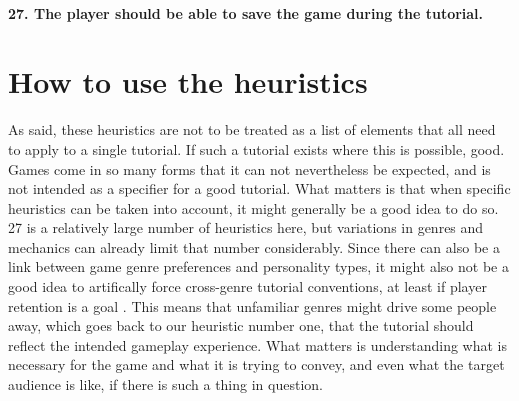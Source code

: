 \paragraph{27. The player should be able to save the game during the tutorial.}

\section{How to use the heuristics}

As said, these heuristics are not to be treated as a list of elements that all need to apply to a single tutorial. If such a tutorial exists where this is possible, good. Games come in so many forms that it can not nevertheless be expected, and is not intended as a specifier for a good tutorial. What matters is that when specific heuristics can be taken into account, it might generally be a good idea to do so. 27 is a relatively large number of heuristics here, but variations in genres and mechanics can already limit that number considerably. Since there can also be a link between game genre preferences and personality types, it might also not be a good idea to artifically force cross-genre tutorial conventions, at least if player retention is a goal \cite{Peever2012}. This means that unfamiliar genres might drive some people away, which goes back to our heuristic number one, that the tutorial should reflect the intended gameplay experience. What matters is understanding what is necessary for the game and what it is trying to convey, and even what the target audience is like, if there is such a thing in question. 












